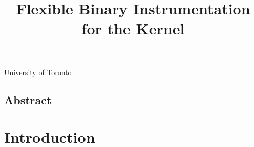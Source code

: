 \documentclass[preprint]{sigplanconf}
\begin{document}
\title{Flexible Binary Instrumentation for the Kernel}

{University of Toronto}{}

\maketitle
\subsection*{Abstract}


\section{Introduction}\label{sec:intro}
\end{document}
